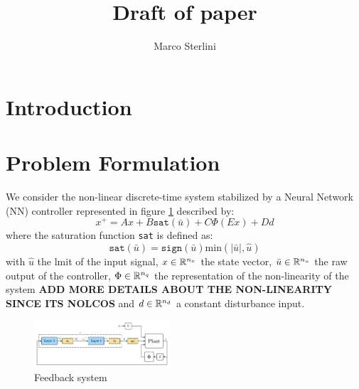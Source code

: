 \documentclass{article}
\begin{document}
\title{Draft of paper}

\author{Marco Sterlini}


\section{Introduction}

\section{Problem Formulation}
We consider the non-linear discrete-time system stabilized by a Neural Network (NN) controller represented in figure \ref{fig:first_scheme} described by:
\begin{equation}
  x^{+} = A x + B \texttt{sat}(\bar{u}) + C \Phi(E x) + D d 
\end{equation}
where the saturation function \texttt{sat} is defined as:
$$
    \texttt{sat}(\bar{u}) = \texttt{sign}(\bar{u})\text{min}(|\bar{u}|, \hat{u})
$$
with $\hat{u}$ the lmit of the input signal, $x \in {\mathbb{R}}^{n_x}$ the state vector, $\bar{u} \in {\mathbb{R}}^{n_u}$ the raw output of the controller, $\Phi \in {\mathbb{R}}^{n_q}$ the representation of the non-linearity of the system \textbf{ADD MORE DETAILS ABOUT THE NON-LINEARITY SINCE ITS NOLCOS} and $d \in {\mathbb{R}}^{n_d}$ a constant disturbance input.

\begin{figure}[H]
    \centering
    \includegraphics[width=0.45\textwidth]{Figures/first_scheme}
    \caption{Feedback system}
    \label{fig:first_scheme}
\end{figure}
\end{document}
